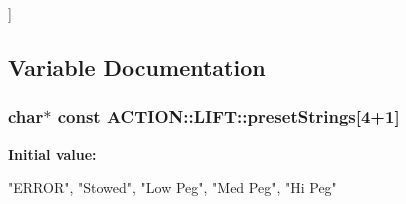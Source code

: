 \begin{Desc}
\begin{description}
{\label{namespace_a_c_t_i_o_n_1_1_l_i_f_t_ab401968ece6d0bdc0105b36c22a9d197a6d76c8d14dd3f911859686614e813d29}
}]\item[{\em 
\hypertarget{namespace_a_c_t_i_o_n_1_1_l_i_f_t_ab401968ece6d0bdc0105b36c22a9d197af6672c361e519a3f9b0138c9c3cce8b5}{
\-H\-I\-G\-H\-\_\-\-P\-E\-G}
\label{namespace_a_c_t_i_o_n_1_1_l_i_f_t_ab401968ece6d0bdc0105b36c22a9d197af6672c361e519a3f9b0138c9c3cce8b5}
}]\end{description}
\end{Desc}



\subsection{\-Variable \-Documentation}
\hypertarget{namespace_a_c_t_i_o_n_1_1_l_i_f_t_a4632e771047b73314a8a53d164470cd3}{
\subsubsection[{preset\-Strings}]{\setlength{\rightskip}{0pt plus 5cm}char$\ast$ const {\bf \-A\-C\-T\-I\-O\-N\-::\-L\-I\-F\-T\-::preset\-Strings}\mbox{[}4+1\mbox{]}}}
\label{namespace_a_c_t_i_o_n_1_1_l_i_f_t_a4632e771047b73314a8a53d164470cd3}
{\bfseries \-Initial value\-:}
\begin{DoxyCode}

        {   "ERROR", "Stowed", "Low Peg", "Med Peg", "Hi Peg" }
\end{DoxyCode}

